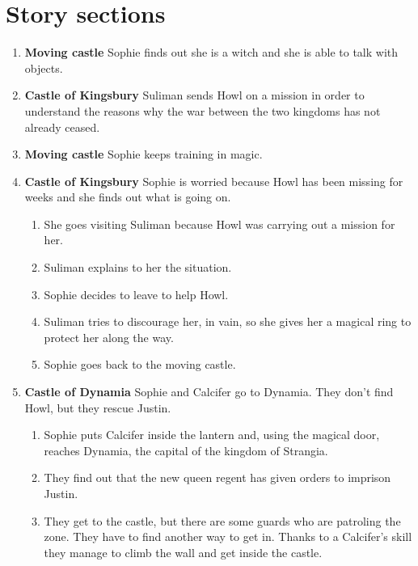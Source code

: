 \section{Story sections}

\begin{enumerate}
\item \textbf{Moving castle} Sophie finds out she is a witch and she is able to talk with objects.
  
\item \textbf{Castle of Kingsbury} Suliman sends Howl on a mission in order to understand the reasons why the war between the two kingdoms has not already ceased.
  
\item \textbf{Moving castle} Sophie keeps training in magic.
  
\item \textbf{Castle of Kingsbury} Sophie is worried because Howl has been missing for weeks and she finds out what is going on.
  \begin{enumerate}
  \item She goes visiting Suliman because Howl was carrying out a mission for her.
    
  \item Suliman explains to her the situation.

  \item Sophie decides to leave to help Howl.

  \item Suliman tries to discourage her, in vain, so she gives her a magical ring to protect her along the way.

  \item Sophie goes back to the moving castle.
  \end{enumerate}

\item \textbf{Castle of Dynamia} Sophie and Calcifer go to Dynamia. They don't find Howl, but they rescue Justin.

  \begin{enumerate}
  \item Sophie puts Calcifer inside the lantern and, using the magical door, reaches Dynamia, the capital of the kingdom of Strangia.
    
  \item They find out that the new queen regent has given orders to imprison Justin.
    
  \item They get to the castle, but there are some guards who are patroling the zone. They have to find another way to get in. Thanks to a Calcifer’s skill they manage to climb the wall and get inside the castle.
    

\end{enumerate}
\end{enumerate}

